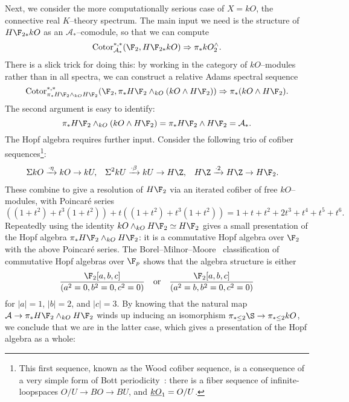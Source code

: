 \begin{example}
Next, we consider the more computationally serious case of $X = kO$, the connective real $K$--theory spectrum.  The main input we need is the structure of $H\F_{2*} kO$ as an $\mathcal A_*$--comodule, so that we can compute \[\Cotor_{\mathcal A_*}^{*, *}(\F_2, H\F_{2*} kO) \Rightarrow \pi_* kO^\wedge_2.\]  There is a slick trick for doing this: by working in the category of $kO$--modules rather than in all spectra, we can construct a relative Adams spectral sequence \[\Cotor_{\pi_* H\F_2 \sm_{kO} H\F_2}^{*, *}(\F_2, \pi_* H\F_2 \sm_{kO}(kO \sm H\F_2)) \Rightarrow \pi_*(kO \sm H\F_2).\]  The second argument is easy to identify: \[\pi_* H\F_2 \sm_{kO}(kO \sm H\F_2) = \pi_* H\F_2 \sm H\F_2 = \mathcal A_*.\]  The Hopf algebra requires further input.  Consider the following trio of cofiber sequences\footnote{This first sequence, known as the Wood cofiber sequence, is a consequence of a very simple form of Bott periodicity~\cite[Section 5]{Harris}: there is a fiber sequence of infinite-loopspaces $O/U \to BO \to BU$, and $\underline{\smash{kO}}_{1} = O/U$.}:
\begin{align*}
\Susp kO & \xrightarrow{\cdot \eta} kO \to kU, &
\Susp^2 kU & \xrightarrow{\cdot \beta} kU \to H\Z, &
H\Z & \xrightarrow{\cdot 2} H\Z \to H\F_2.
\end{align*}
These combine to give a resolution of $H\F_2$ via an iterated cofiber of free $kO$--modules, with Poincar\'e series \[((1 + t^2) + t^3(1 + t^2)) + t((1 + t^2) + t^3(1 + t^2)) = 1 + t + t^2 + 2t^3 + t^4 + t^5 + t^6.\]  Repeatedly using the identity $kO \sm_{kO} H\F_2 \simeq H\F_2$ gives a small presentation of the Hopf algebra $\pi_* H\F_2 \sm_{kO} H\F_2$: it is a commutative Hopf algebra over $\F_2$ with the above Poincar\'e series.  The Borel--Milnor--Moore~\cite[Theorem 7.11]{MilnorMoore} classification of commutative Hopf algebras over $\F_p$ shows that the algebra structure is either \[\frac{\F_2[a, b, c]}{(a^2 = 0, b^2 = 0, c^2 = 0)} \quad \text{or} \quad \frac{\F_2[a, b, c]}{(a^2 = b, b^2 = 0, c^2 = 0)}\] for $|a| = 1$, $|b| = 2$, and $|c| = 3$.  By knowing that the natural map $\mathcal A \to \pi_* H\F_2 \sm_{kO} H\F_2$ winds up inducing an isomorphism $\pi_{* \le 2} \S \to \pi_{* \le 2} kO$, we conclude that we are in the latter case, which gives a presentation of the Hopf algebra as a whole:
\begin{center}
\end{center}
\end{example}
